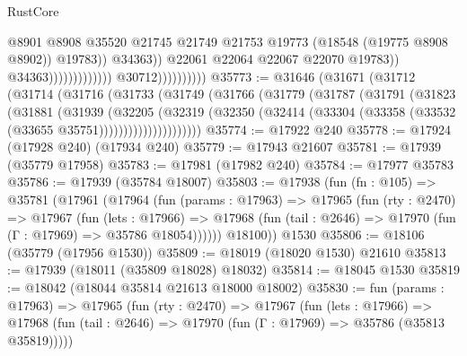 \begin{lexlean}{RustCore}
\begin{coremodule}
                                                              @8901
                                                              @8908
                                                              @35520
                                                              @21745
                                                              @21749
                                                              @21753
                                                              @19773
                                                              (@18548 (@19775 @8908 @8902))
                                                              @19783))
                                                          @34363))
                                                      @22061
                                                      @22064
                                                      @22067
                                                      @22070
                                                      @19783))
                                                  @34363)))))))))))))
                        @30712))))))))))
@35773 := @31646
    (@31671
      (@31712
        (@31714
          (@31716
            (@31733
              (@31749
                (@31766
                  (@31779
                    (@31787
                      (@31791
                        (@31823
                          (@31881
                            (@31939
                              (@32205
                                (@32319
                                  (@32350
                                    (@32414
                                      (@33304 (@33358 (@33532 (@33655 @35751)))))))))))))))))))))
@35774 := @17922 @240
@35778 := @17924 (@17928 @240) (@17934 @240)
@35779 := @17943 @21607
@35781 := @17939 (@35779 @17958)
@35783 := @17981 (@17982 @240)
@35784 := @17977 @35783
@35786 := @17939 (@35784 @18007)
@35803 := @17938
    (fun (fn : @105) =>
    @35781
      (@17961
        (@17964
          (fun (params : @17963) =>
          @17965
            (fun (rty : @2470) =>
            @17967
              (fun (lets : @17966) =>
              @17968 (fun (tail : @2646) => @17970 (fun (Γ : @17969) => @35786 @18054))))))
        @18100))
    @1530
@35806 := @18106 (@35779 (@17956 @1530))
@35809 := @18019 (@18020 @1530) @21610
@35813 := @17939 (@18011 (@35809 @18028) @18032)
@35814 := @18045 @1530
@35819 := @18042 (@18044 @35814 @21613 @18000 @18002)
@35830 := fun (params : @17963) =>
  @17965
    (fun (rty : @2470) =>
    @17967
      (fun (lets : @17966) =>
      @17968 (fun (tail : @2646) => @17970 (fun (Γ : @17969) => @35786 (@35813 @35819)))))

\end{coremodule}
\end{lexlean}
